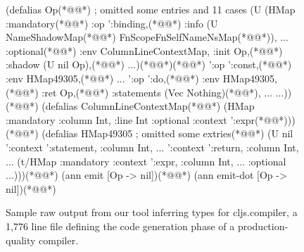 \begin{figure}
\begin{cljlistingnumbered}
  (defalias Op(*@\label{infer:listing:cljs:Op}@*) ; omitted some entries and 11 cases
    (U (HMap :mandatory(*@\label{infer:listing:cljs:Op:op:bindingStart}@*)
             {:op ':binding,(*@\label{infer:listing:cljs:Op:op:binding}@*)
              :info (U NameShadowMap(*@\label{infer:listing:cljs:Op:op:binding:NameShadowMap}@*)
                       FnScopeFnSelfNameNsMap(*@\label{infer:listing:cljs:Op:op:binding:FnScopeFnSelfNameNsMap}@*)), ...}
             :optional(*@\label{infer:listing:cljs:Op:optional}@*)
             {:env ColumnLineContextMap, :init Op,(*@\label{infer:listing:cljs:Op:optional:init:Op}@*)
              :shadow (U nil Op),(*@\label{infer:listing:cljs:Op:optional:shadow:Op}@*) ...})(*@\label{infer:listing:cljs:Op:optionalEnd}@*)(*@\label{infer:listing:cljs:Op:op:bindingEnd}@*)
      '{:op ':const,(*@\label{infer:listing:cljs:Op:op:const}@*) :env HMap49305,(*@\label{infer:listing:cljs:Op:op:const:HMap49305}@*) ...}
      '{:op ':do,(*@\label{infer:listing:cljs:Op:op:do}@*) :env HMap49305,(*@\label{infer:listing:cljs:Op:op:do:HMap49305}@*)
        :ret Op,(*@\label{infer:listing:cljs:Op:op:do:Op}@*) :statements (Vec Nothing)(*@\label{infer:listing:cljs:Op:op:do:statements}@*), ...}
      ...))(*@\label{infer:listing:cljs:Op-End}@*)
  (defalias ColumnLineContextMap(*@\label{infer:listing:cljs:ColumnLineContextMap}@*)
    (HMap :mandatory {:column Int, :line Int}
          :optional {:context ':expr}(*@\label{infer:listing:cljs:ColumnLineContextMap:optional}@*)))(*@\label{infer:listing:cljs:ColumnLineContextMapEnd}@*)
  (defalias HMap49305 ; omitted some extries(*@\label{infer:listing:cljs:HMap49305}@*)
    (U nil
       '{:context ':statement, :column Int, ...}
       '{:context ':return, :column Int, ...}
       (t/HMap :mandatory
               {:context ':expr, :column Int, ...}
               :optional {...})))(*@\label{infer:listing:cljs:HMap49305End}@*)
  (ann emit [Op -> nil])(*@\label{infer:listing:cljs:emit}@*)
  (ann emit-dot [Op -> nil])(*@\label{infer:listing:cljs:emit-dot}@*)
\end{cljlistingnumbered}
\caption{
         Sample raw output from our
         tool inferring types for cljs.compiler,
         a 1,776 line file defining the code generation phase of
         a production-quality compiler.
}
\end{figure}
